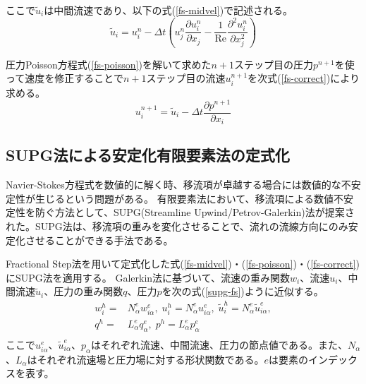 ここで$\tilde{u}_{i}$は中間流速であり、以下の式(\ref{fs-midvel})で記述される。
\begin{equation}
\label{fs-midvel}
	\tilde{u}_{i} = u_{i}^{n} - \Delta t
	\left(u_{j}^{n} \frac{\partial u_{i}^{n}}{\partial x_{j}} 
	- \frac{1}{\mathrm{Re}} \frac{\partial^{2} u_{i}^{n}}{\partial x_{j}^{2}}\right)
\end{equation}

圧力Poisson方程式(\ref{fs-poisson})を解いて求めた$n+1$ステップ目の圧力$p^{n+1}$を使って速度を修正することで$n+1$ステップ目の流速$u^{n+1}_{i}$を次式(\ref{fs-correct})により求める。
\begin{equation}
\label{fs-correct}
	u^{n+1}_i=\tilde{u}_i - \Delta t \frac{\partial p^{n+1}}{\partial x_i}
\end{equation}

\subsection{SUPG法による安定化有限要素法の定式化}
Navier-Stokes方程式を数値的に解く時、移流項が卓越する場合には数値的な不安定性が生じるという問題がある。
有限要素法において、移流項による数値不安定性を防ぐ方法として、SUPG(Streamline Upwind/Petrov-Galerkin)法が提案された。SUPG法は、移流項の重みを変化させることで、流れの流線方向にのみ安定化させることができる手法である。

Fractional Step法を用いて定式化した式(\ref{fs-midvel})・(\ref{fs-poisson})・(\ref{fs-correct})にSUPG法を適用する。
Galerkin法に基づいて、流速の重み関数$w_{i}$、流速$u_{i}$、中間流速$\tilde{u}_{i}$、圧力の重み関数$q$、圧力$p$を次の式(\ref{supg-fs})ように近似する。
\begin{equation}
\label{supg-fs}
	\begin{split}
		w_{i}^{h}=&N_{\alpha}^{e} w_{i\alpha}^{e},\; u_{i}^{h}=N_{\alpha}^{e} u_{i\alpha}^{e},\; 
		\tilde{u}_{i}^{h}=N_{\alpha}^{e} \tilde{u}_{i\alpha}^{e}, \\
		q^{h}=&L_{\alpha}^{e} q_{\alpha}^{e}, \; p^{h}=L_{\alpha}^{e} p_{\alpha}^{e} \\
	\end{split}
\end{equation}
ここで$u_{i\alpha}^{e}$、$\tilde{u}_{i\alpha}^{e}$、$p_{\alpha}$はそれぞれ流速、中間流速、圧力の節点値である。また、$N_{\alpha}$、$L_{\alpha}$はそれぞれ流速場と圧力場に対する形状関数である。$e$は要素のインデックスを表す。

